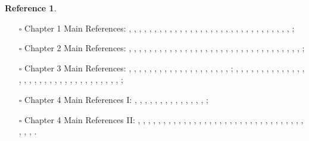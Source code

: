 \documentclass[12pt]{book}
\theoremstyle{definition}
\newtheorem{reference}{Reference}
\begin{document}
\begin{reference}\mbox{}
\begin{itemize}
\item[$\square$] Chapter 1 Main References: \cite{Sch1}, \cite{KL1}, \cite{KL2}, \cite{BL1}, \cite{BL2}, \cite{BS}, \cite{BHS}, \cite{Fon1}, \cite{CS1}, \cite{CS2}, \cite{BK}, \cite{BBK}, \cite{BBBK}, \cite{KKM}, \cite{KM}, \cite{LZ}, \cite{TT}, \cite{B}, \cite{Shi}, \cite{AI1}, \cite{AI2}, \cite{AI3}, \cite{AB1}, \cite{AB2}, \cite{Fon2}, \cite{Fon3}, \cite{Fa1}, \cite{M}, \cite{Fa2}, \cite{Fa3}, \cite{Fon4}, \cite{Fon5}, \cite{Fon6}; 
\item[$\square$] Chapter 2 Main References: \cite{Sch1}, \cite{Sch2}, \cite{FS}, \cite{KL1}, \cite{KL2}, \cite{BL1}, \cite{BL2}, \cite{BS}, \cite{BHS}, \cite{Fon1}, \cite{CS1}, \cite{CS2}, \cite{BK}, \cite{BBK}, \cite{BBBK}, \cite{KKM}, \cite{KM}, \cite{LZ}, \cite{TT}, \cite{B}, \cite{Shi}, \cite{AI1}, \cite{AI2}, \cite{AI3}, \cite{AB1}, \cite{AB2}, \cite{Fon2}, \cite{Fon3}, \cite{Fa1}, \cite{M}, \cite{Fa2}, \cite{Fa3}, \cite{Fon4}, \cite{Fon5}, \cite{Fon6};
\item[$\square$] Chapter 3 Main References: \cite{Sch1}, \cite{Sch2}, \cite{FS}, \cite{FF}, \cite{KL1}, \cite{KL2}, \cite{BL1}, \cite{BL2}, \cite{BS}, \cite{BHS}, \cite{Fon1}, \cite{CS1}, \cite{CS2}, \cite{BK}, \cite{BBK}, \cite{BBBK}, \cite{KKM}, \cite{KM}, \cite{LBV}, \cite{B}, \cite{SW}; \cite{Sch1}, \cite{Sch2}, \cite{FS}, \cite{KL1}, \cite{KL2}, \cite{BL1}, \cite{BL2}, \cite{BS}, \cite{BHS}, \cite{Fon1}, \cite{CS1}, \cite{CS2}, \cite{BK}, \cite{BBK}, \cite{BBBK}, \cite{KKM}, \cite{KM}, \cite{LZ}, \cite{TT}, \cite{B}, \cite{Shi}, \cite{AI1}, \cite{AI2}, \cite{AI3}, \cite{AB1}, \cite{AB2}, \cite{Fon2}, \cite{Fon3}, \cite{Fa1}, \cite{M}, \cite{Fa2}, \cite{Fa3}, \cite{Fon4}, \cite{Fon5}, \cite{Fon6};
\item[$\square$] Chapter 4 Main References I: \cite{FS}, \cite{FF}, \cite{Sch1}, \cite{Sch2}, \cite{KL1}, \cite{KL2}, \cite{LBV}, \cite{B}, \cite{SW}, \cite{BS}, \cite{Lan1}, \cite{Drin1}, \cite{Drin2}, \cite{Zhu}, \cite{DHKM};
\item[$\square$] Chapter 4 Main References II: \cite{pHodgeT}, \cite{pHodgeF}, \cite{pHodgeS1}, \cite{pHodgeS2}, \cite{pHodgeKL1}, \cite{pHodgeKL2}, \cite{pHodgeBS}, \cite{pHodgeKPX}, \cite{pToAnCS1}, \cite{pToAnCS2}, \cite{pToAnCS3}, \cite{pToAnCS4},  
\cite{pToAnBBBK}, \cite{LPL}, \cite{LPD1}, \cite{LPLL}, \cite{LPVL}, \cite{LPC}, \cite{LPFS}, \cite{LPGL}, \cite{LPEGH}, \cite{LPEG}, \cite{LPZ}, \cite{LPDHKM}, \cite{LPD2}, \cite{LPL}, \cite{LPD1}, \cite{LPLL}, \cite{LPVL}, \cite{LPC}, \cite{LPFS}, \cite{LPGL}, \cite{LPEGH}, \cite{LPEG}, \cite{LPZ}, \cite{LPDHKM}, \cite{LPD2}.
\end{itemize}
\end{reference}
\end{document}
